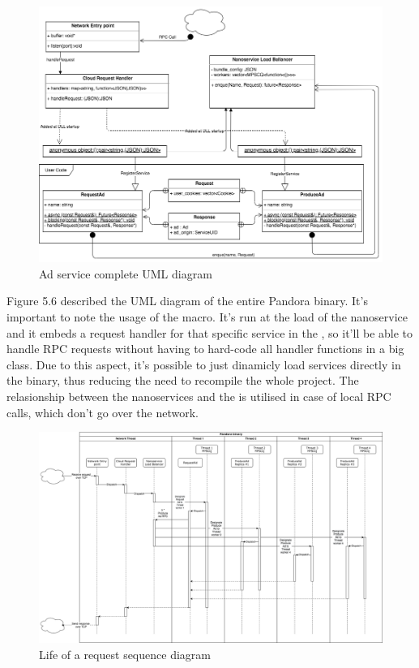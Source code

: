 \begin{figure}[H]
\includegraphics[width=1\linewidth]{content/fig/code-uml.png}
\caption{Ad service complete UML diagram}
\end{figure}

Figure 5.6 described the UML diagram of the entire Pandora binary. It's important to note the usage of the  macro. It's run at the load of the nanoservice and it embeds a request handler for that specific service in the , so it'll be able to handle RPC requests without having to hard-code all handler functions in a big class. Due to this aspect, it's possible to just dinamicly load services directly in the binary, thus reducing the need to recompile the whole project. The relasionship between the nanoservices and the  is utilised in case of local RPC calls, which don't go over the network.

\begin{figure}[H]
\includegraphics[width=1\linewidth]{content/fig/life-of-a-request.png}
\caption{Life of a request sequence diagram}
\end{figure}

